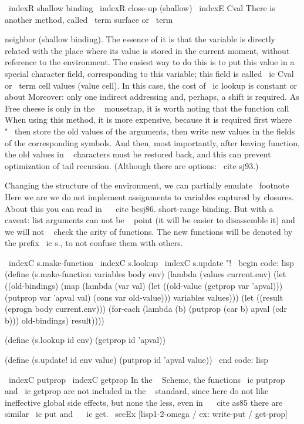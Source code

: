 {{\ indexR {shallow} binding}
\ indexR {close-up (shallow)}
\ indexE {Cval}
There is another method, called \ term {surface} or \ term {neighbor
(shallow binding). The essence of it is that the variable is directly related
with the place where its value is stored in the current moment, without reference to the environment.
The easiest way to do this is to put this value in a special character field,
corresponding to this variable; this field is called \ ic {Cval} or \ term {cell
values} (value cell). In this case, the cost of \ ic {lookup} is constant or about
Moreover: only one indirect addressing and, perhaps, a shift is required. As
Free cheese is only in the ~ mousetrap, it is worth noting that the function call
When using this method, it is more expensive, because it is required first
where "~ then store the old values ​​of the arguments, then write new values
in the fields of the corresponding symbols. And then, most importantly, after leaving
function, the old values ​​in ~ characters must be restored back, and this can
prevent optimization of tail recursion. (Although there are options: \ cite {sj93}.)

Changing the structure of the environment, we can partially emulate \ footnote {Here we are
we do not implement assignments to variables captured by closures. About this you can
read in ~ \ cite {bcsj86}.} short-range binding. But with a ~ caveat: list
arguments can not be ~ point (it will be easier to disassemble it) and we will not ~
check the arity of functions. The new functions will be denoted by the prefix \ ic {s.},
to not confuse them with others.

\ indexC {s.make-function}
\ indexC {s.lookup}
\ indexC {s.update "!}
\ begin {code: lisp}
(define (s.make-function variables body env)
  (lambda (values ​​current.env)
    (let ((old-bindings)
           (map (lambda (var val)
                  (let ((old-value (getprop var 'apval)))
                    (putprop var 'apval val)
                    (cons var old-value)))
                variables
                values)))
      (let ((result (eprogn body current.env)))
        (for-each (lambda (b) (putprop (car b) apval (cdr b)))
                  old-bindings)
        result))))

(define (s.lookup id env)
  (getprop id 'apval))

(define (s.update! id env value)
  (putprop id 'apval value))
\ end {code: lisp}

\ indexC {putprop} \ indexC {getprop}
In the ~ Scheme, the functions \ ic {putprop} and \ ic {getprop} are not included in the ~ standard, since here
do not like ineffective global side effects, but none the less, even
in ~ \ cite {as85} there are similar \ ic {put} and ~ \ ic {get}.
\ seeEx [lisp1-2-omega / ex: write-put / get-prop]

}}
